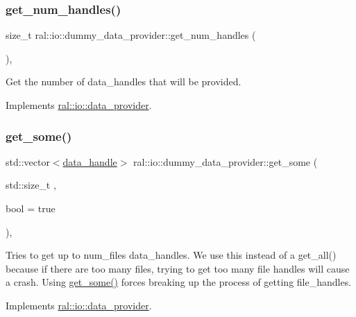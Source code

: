 \subsubsection{\texorpdfstring{get\+\_\+num\+\_\+handles()}{get\_num\_handles()}}
{\footnotesize\ttfamily size\+\_\+t ral\+::io\+::dummy\+\_\+data\+\_\+provider\+::get\+\_\+num\+\_\+handles (\begin{DoxyParamCaption}{ }\end{DoxyParamCaption})\hspace{0.3cm}{\ttfamily [inline]}, {\ttfamily [virtual]}}

Get the number of data\+\_\+handles that will be provided. 

Implements \hyperlink{classral_1_1io_1_1data__provider_a00ff9cc629a869d7b7e6a67c90056749}{ral\+::io\+::data\+\_\+provider}.

\mbox{\label{classral_1_1io_1_1dummy__data__provider_a5ceffe12bf6a535db61b30575f634c8f}} 
\subsubsection{\texorpdfstring{get\+\_\+some()}{get\_some()}}
{\footnotesize\ttfamily std\+::vector$<$\hyperlink{structral_1_1io_1_1data__handle}{data\+\_\+handle}$>$ ral\+::io\+::dummy\+\_\+data\+\_\+provider\+::get\+\_\+some (\begin{DoxyParamCaption}\item[{std\+::size\+\_\+t}]{,  }\item[{bool}]{ = {\ttfamily true} }\end{DoxyParamCaption})\hspace{0.3cm}{\ttfamily [inline]}, {\ttfamily [virtual]}}

Tries to get up to num\+\_\+files data\+\_\+handles. We use this instead of a get\+\_\+all() because if there are too many files, trying to get too many file handles will cause a crash. Using \hyperlink{classral_1_1io_1_1dummy__data__provider_a5ceffe12bf6a535db61b30575f634c8f}{get\+\_\+some()} forces breaking up the process of getting file\+\_\+handles. 

Implements \hyperlink{classral_1_1io_1_1data__provider_ae65c935f9812ac3321b0c814fa4a5548}{ral\+::io\+::data\+\_\+provider}.

